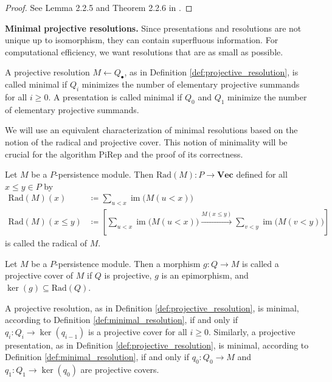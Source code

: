 \documentclass[english,a4paper,nolineno,cleveref]{socg-lipics-v2021}
\DeclareMathOperator{\im}{im}
\begin{document}
\begin{proof}
See Lemma 2.2.5 and Theorem 2.2.6 in \cite{Weibel_1994}.
\end{proof}


\textbf{Minimal projective resolutions.} Since presentations and resolutions are not unique up to isomorphism, they can contain superfluous information. For computational efficiency, we want resolutions that are as small as possible.

\begin{definition} \label{def:minimal_resolution}
A projective resolution $M\leftarrow Q_\bullet$, as in Definition  \ref{def:projective_resolution}, is called minimal if $Q_i$ minimizes the number of elementary projective summands for all $i\geq 0$. A presentation is called minimal if $Q_0$ and $Q_1$ minimize the number of elementary projective summands.
\end{definition}


We will use an equivalent characterization of minimal resolutions based on the notion of the radical and projective cover. This notion of minimality will be crucial for the algorithm {\sc PiRep} and the proof of its correctness. 

\begin{definition}[Radical] \label{def:radical}
Let $M$ be a $P$-persistence module. Then $\mathrm{Rad}(M)\colon P\rightarrow \mathbf{Vec}$ defined for all $x\leq y\in P$ by 
\begin{equation*}
\begin{aligned}
\mathrm{Rad}(M)(x)&\coloneqq \sum_{u<x}\im\!\big( M(u<x)\big) \\
\mathrm{Rad}(M)(x\leq y)&\coloneqq \left[ \sum_{u<x}\im \!\big(M(u<x)\big)\xrightarrow{M(x\leq y)} \sum_{v<y}\im \!\big(M(v<y)\big) \right]
\end{aligned}
\end{equation*}
is called the radical of $M$.
\end{definition}

\begin{definition} \label{def:projective_cover}
Let $M$ be a $P$-persistence module. Then a morphism $g\colon Q\rightarrow M$ is called a projective cover of $M$ if $Q$ is projective, $g$ is an epimorphism, and $\ker(g)\subseteq \mathrm{Rad}(Q)$.
\end{definition}

\begin{proposition}\label{prop:minimal_eqq_projective_cover}
A projective resolution, as in Definition \ref{def:projective_resolution}, is minimal, according to Definition \ref{def:minimal_resolution}, if and only if $q_i\colon Q_i\rightarrow\ker(q_{i\minus 1})$ is a projective cover for all $i\geq 0$. Similarly, a projective presentation, as in Definition \ref{def:projective_resolution}, is minimal, according to Definition \ref{def:minimal_resolution}, if and only if $q_0:Q_0\rightarrow M$ and $q_1\colon Q_1\rightarrow \ker(q_0)$ are projective covers. 
\end{proposition}
\end{document}
